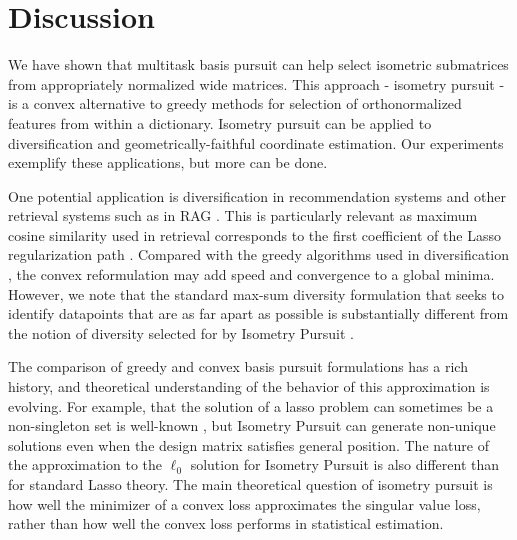 \section{Discussion}
\label{sec:discussion}

We have shown that multitask basis pursuit can help select isometric submatrices from appropriately normalized wide matrices.
This approach - isometry pursuit - is a convex alternative to greedy methods for selection of orthonormalized features from within a dictionary.
Isometry pursuit can be applied to diversification and geometrically-faithful coordinate estimation.
Our experiments exemplify these applications, but more can be done.

One potential application is diversification in recommendation systems \citep{Carbonell2017-gi, Wu2019-uk, Langchain} and other retrieval systems such as in RAG \citep{Gao2023-cn, Pickett2024-ad, In2024-um, Weiss2024-xm, Vectara}.
This is particularly relevant as maximum cosine similarity used in retrieval corresponds to the first coefficient of the Lasso regularization path \citep{Koelle2022-ju}.
Compared with the greedy algorithms used in diversification \citep{Carbonell1998-ji, Barioni, Drosou, Qin2012-ok, KUNAVER2017154, Guo-shengbo, Abdool,Yu2016AGA,  Huang2024-wr, Pickett2024-ad, 5895106, Zhu2020-vb}, the convex reformulation may add speed and convergence to a global minima.
However, we note that the standard max-sum diversity formulation that seeks to identify datapoints that are as far apart as possible is substantially different from the notion of diversity selected for by Isometry Pursuit \citep{Kuo1993-zy, Ghosh1996-id, Alfonso-Cevallos-Friedrich-Eisenbrand-and-Rico-Zenklusen2016-ai, Ashkan2015-jv}.

The comparison of greedy \cite{Mallat93-wi, Mallat, Pati-93, Tropp05-ml} and convex \citep{Chen2001-hh, Tropp06-sg,Chen2006TheoreticalRO} basis pursuit formulations has a rich history, and theoretical understanding of the behavior of this approximation is evolving.
For example, that the solution of a lasso problem can sometimes be a non-singleton set is well-known \citep{Osborne2000OnTL, DOSSAL2012117, Chrtien2011OnTG, Tibshirani2012TheLP, Ewald2017OnTD, Ali2018TheGL, Schneider2020-qt, Mishkin2022TheSP,Dupuis2019TheGO,Debarre2020OnTU,Everink2024TheGA}, but Isometry Pursuit can generate non-unique solutions even when the design matrix satisfies general position.
The nature of the approximation to the $\ell_0$ solution for Isometry Pursuit is also different than for standard Lasso theory.
The main theoretical question of isometry pursuit is how well the minimizer of a convex loss approximates the singular value loss, rather than how well the convex loss performs in statistical estimation.

